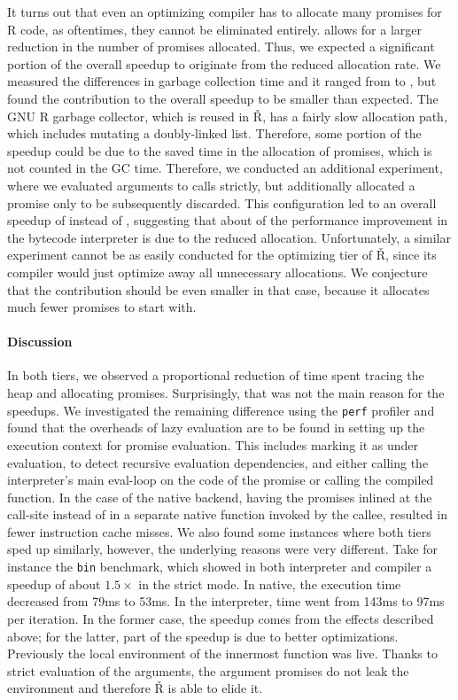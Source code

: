 \documentclass[review,screen,acmsmall]{acmart}
\renewcommand{\Rsh}{{\sf\v R}\xspace}
\begin{document}
It turns out that even an optimizing compiler has to allocate many promises for
R code, as oftentimes, they cannot be eliminated entirely. \rshstrict allows for
a larger reduction in the number of promises allocated. Thus, we expected a
significant portion of the overall speedup to originate from the reduced
allocation rate. We measured the differences in garbage collection time and it
ranged from \speedupGCRshStrictMin to \speedupGCRshStrictMax, but found the
contribution to the overall speedup to be smaller than expected. The GNU R
garbage collector, which is reused in \Rsh, has a fairly slow allocation path,
which includes mutating a doubly-linked list. Therefore, some portion of the
speedup could be due to the saved time in the allocation of promises, which is
not counted in the GC time. Therefore, we conducted an additional experiment,
where we evaluated arguments to calls strictly, but additionally allocated a
promise only to be subsequently discarded. This configuration led to an overall
speedup of \speedupBCRshStrictAlloc instead of \speedupBCRshStrict, suggesting
that about \speedupDueToReducedGC of the performance improvement in the bytecode
interpreter is due to the reduced allocation. Unfortunately, a similar
experiment cannot be as easily conducted for the optimizing tier of \Rsh, since
its compiler would just optimize away all unnecessary allocations. We conjecture
that the contribution should be even smaller in that case, because it allocates
much fewer promises to start with.

\paragraph{Discussion}

In both tiers, we observed a proportional reduction of time spent tracing the
heap and allocating promises. Surprisingly, that was not the main reason
for the speedups. We investigated the remaining difference using the
\lstinline{perf} profiler and found that the overheads of lazy evaluation are to
be found in setting up the execution context for promise evaluation. This
includes marking it as under evaluation, to detect recursive evaluation dependencies,
and either calling the interpreter's main eval-loop on the code of the promise or
calling the compiled function. In the case of the native backend, having the
promises inlined at the call-site instead of in a separate native function
invoked by the callee, resulted in fewer instruction cache misses. We also found
some instances where both tiers sped up similarly, however, the underlying
reasons were very different. Take for instance the \lstinline{bin} benchmark,
which showed in both interpreter and compiler a speedup of about $1.5\times$ in
the strict mode. In native, the execution time decreased from 79ms to 53ms. In
the interpreter, time went from 143ms to 97ms per iteration. In the former case,
the speedup comes from the effects described above; for the latter, part of the
speedup is due to better optimizations. Previously the local environment of
the innermost function was live. Thanks to strict evaluation of the arguments,
the argument promises do not leak the environment and therefore \Rsh is able to
elide it.
\end{document}
